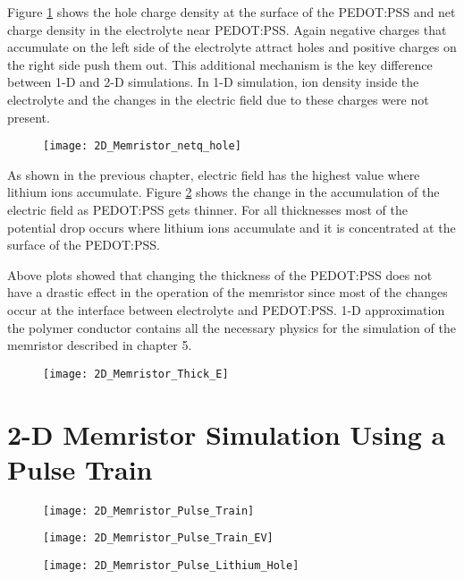\clearpage
Figure \ref{thick_netq_p} shows the hole charge density at the surface of the PEDOT:PSS and net charge density in the electrolyte near PEDOT:PSS. Again negative charges that accumulate on the left side of the electrolyte attract holes and positive charges on the right side push them out. This additional mechanism is the key difference between 1-D and 2-D simulations. In 1-D simulation, ion density inside the electrolyte and the changes in the electric field due to these charges were not present.

\begin{figure}[!htp]
\centering
\texttt{[image: 2D\_Memristor\_netq\_hole]}
\caption{} 
\label{thick_netq_p}
\end{figure}

As shown in the previous chapter, electric field has the highest value where lithium ions accumulate. Figure \ref{thick_efield} shows the change in the accumulation of the electric field as PEDOT:PSS gets thinner. For all thicknesses most of the potential drop occurs where lithium ions accumulate and it is concentrated at the surface of the PEDOT:PSS. 

Above plots showed that changing the thickness of the PEDOT:PSS does not have a drastic effect in the operation of the memristor since most of the changes occur at the interface between electrolyte and PEDOT:PSS. 1-D approximation the polymer conductor contains all the necessary physics for the simulation of the memristor described in chapter 5.

\begin{figure}[!htp]
\centering
\texttt{[image: 2D\_Memristor\_Thick\_E]}
\caption{} 
\label{thick_efield}
\end{figure}


\clearpage
\section{2-D Memristor Simulation Using a Pulse Train}

\begin{figure}[!htp]
\centering
\texttt{[image: 2D\_Memristor\_Pulse\_Train]}
\caption{} 
\label{}
\end{figure}


\begin{figure}[!htp]
\centering
\texttt{[image: 2D\_Memristor\_Pulse\_Train\_EV]}
\caption{} 
\label{}
\end{figure}

\begin{figure}[!htp]
\centering
\texttt{[image: 2D\_Memristor\_Pulse\_Lithium\_Hole]}
\caption{} 
\label{}
\end{figure}

